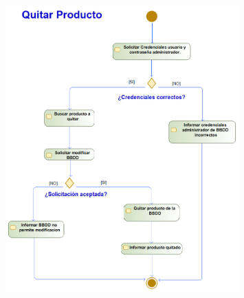 \begin{figure}[H]
	\centering
	\includegraphics[width=0.8\textwidth]{Use_Cases/ProyectoIS_QuitarProducto.png}
\end{figure}
\newpage
